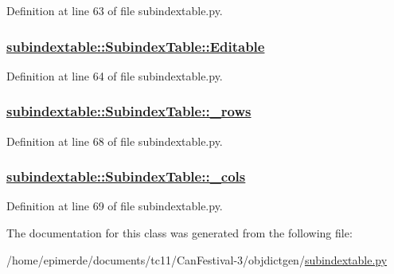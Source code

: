 Definition at line 63 of file subindextable.py.\hypertarget{classsubindextable_1_1SubindexTable_747986e24195de77f7c1e20a5a547c22}{
\subsubsection[Editable]{\setlength{\rightskip}{0pt plus 5cm}\hyperlink{classsubindextable_1_1SubindexTable_747986e24195de77f7c1e20a5a547c22}{subindextable::Subindex\-Table::Editable}}}
\label{classsubindextable_1_1SubindexTable_747986e24195de77f7c1e20a5a547c22}




Definition at line 64 of file subindextable.py.\hypertarget{classsubindextable_1_1SubindexTable_501fbeed9ff17247fb2376b4b5b1c936}{
\subsubsection[\_\-rows]{\setlength{\rightskip}{0pt plus 5cm}\hyperlink{classsubindextable_1_1SubindexTable_501fbeed9ff17247fb2376b4b5b1c936}{subindextable::Subindex\-Table::\_\-rows}}}
\label{classsubindextable_1_1SubindexTable_501fbeed9ff17247fb2376b4b5b1c936}




Definition at line 68 of file subindextable.py.\hypertarget{classsubindextable_1_1SubindexTable_167f300b04601f8034e98dc89a3cacca}{
\subsubsection[\_\-cols]{\setlength{\rightskip}{0pt plus 5cm}\hyperlink{classsubindextable_1_1SubindexTable_167f300b04601f8034e98dc89a3cacca}{subindextable::Subindex\-Table::\_\-cols}}}
\label{classsubindextable_1_1SubindexTable_167f300b04601f8034e98dc89a3cacca}




Definition at line 69 of file subindextable.py.

The documentation for this class was generated from the following file:\begin{CompactItemize}
\item 
/home/epimerde/documents/tc11/Can\-Festival-3/objdictgen/\hyperlink{subindextable_8py}{subindextable.py}\end{CompactItemize}
